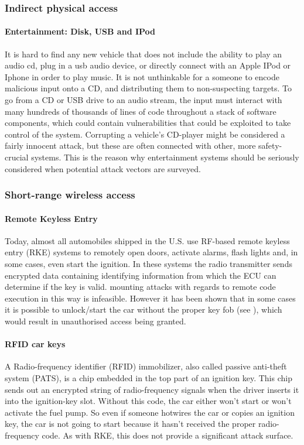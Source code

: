 \documentclass[master=cws,masteroption=vs,english]{kulemt}
\begin{document}
\subsubsection{Indirect physical access}

\paragraph{Entertainment: Disk, USB and IPod} It is hard to find any new vehicle that does not include the ability to play an audio cd, plug in a usb audio device, or directly connect with an Apple IPod or Iphone in order to play music. It is not unthinkable for a someone to encode malicious input onto a CD, and distributing them to non-suspecting targets. To go from a CD or USB drive to an audio stream, the input must interact with many hundreds of thousands of lines of code throughout a stack of software components, which could contain vulnerabilities that could be exploited to take control of the system\cite{Pike15}. Corrupting a vehicle's CD-player might be considered a fairly innocent attack, but these are often connected with other, more safety-crucial systems. This is the reason why entertainment systems should be seriously considered when potential attack vectors are surveyed.

\subsubsection{Short-range wireless access}

\paragraph{Remote Keyless Entry} Today, almost all automobiles shipped in the U.S. use RF-based remote keyless entry (RKE) systems to remotely open doors, activate alarms, flash lights and, in some cases, even start the ignition\cite{Kosher}. In these systems the radio transmitter sends encrypted data containing identifying information from which the ECU can determine if the key is valid\cite{MillerA}. mounting attacks with regards to remote code execution in this way is infeasible. However it has been shown that in some cases it is possible to unlock/start the car without the proper key fob (see \cite{KeeLoq}), which would result in unauthorised access being granted.

\paragraph{RFID car keys} A Radio-frequency identifier (RFID) immobilizer, also called passive anti-theft system (PATS), is a chip embedded in the top part of an ignition key. This chip sends out an encrypted string of radio-frequency signals when the driver inserts it into the ignition-key slot. Without this code, the car either won't start or won't activate the fuel pump. So even if someone hotwires the car or copies an ignition key, the car is not going to start because it hasn't received the proper radio-frequency code\cite{RFID}. As with RKE, this does not provide a significant attack surface.\cite{MillerA}
\end{document}
